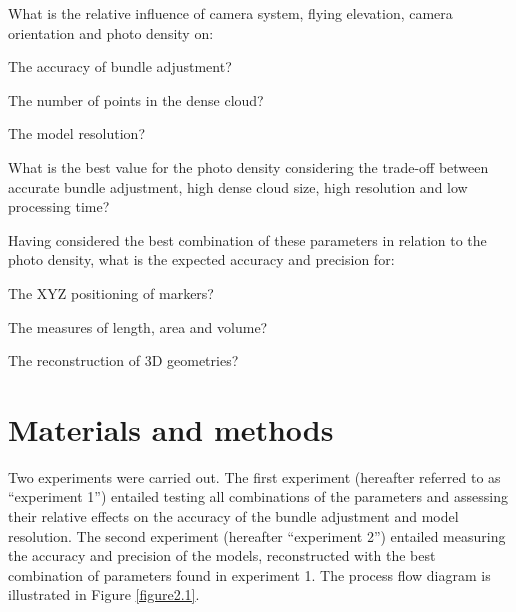 
\begin{inparaenum}
  \item What is the relative influence of camera system, flying elevation, camera orientation and photo density on:
  \begin{inparaenum}
    \item The accuracy of bundle adjustment?
    \item The number of points in the dense cloud?
    \item The model resolution?
  \end{inparaenum}
  \item What is the best value for the photo density considering the trade-off between accurate bundle adjustment, high dense cloud size, high resolution and low processing time?
   \item Having considered the best combination of these parameters in relation to the photo density, what is the expected accuracy and precision for:
  \begin{inparaenum}
    \item The XYZ positioning of markers? 
    \item The measures of length, area and volume?
    \item The reconstruction of 3D geometries?
  \end{inparaenum}
\end{inparaenum}

\section{Materials and methods}\label{chapitre2_2}

Two experiments were carried out. The first experiment (hereafter referred to as “experiment 1”) entailed testing all combinations of the parameters and assessing their relative effects on the accuracy of the bundle adjustment and model resolution. The second experiment (hereafter “experiment 2”) entailed measuring the accuracy and precision of the models, reconstructed with the best combination of parameters found in experiment 1. The process flow diagram is illustrated in Figure \ref{figure2.1}.

